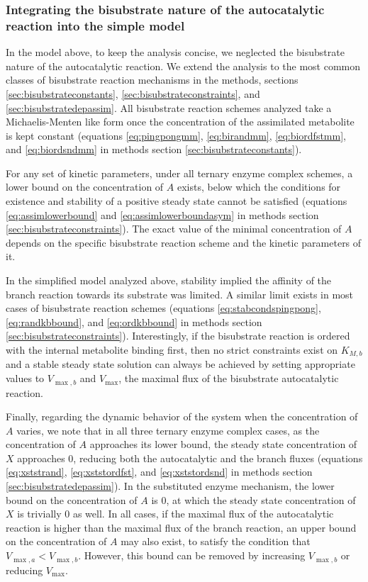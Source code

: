     \subsubsection{Integrating the bisubstrate nature of the autocatalytic reaction into the simple model}
    In the model above, to keep the analysis concise, we neglected the bisubstrate nature of the autocatalytic reaction.
    We extend the analysis to the most common classes of bisubstrate reaction mechanisms in the methods, sections \ref{sec:bisubstrateconstants}, \ref{sec:bisubstrateconstraints}, and \ref{sec:bisubstratedepassim}.
    All bisubstrate reaction schemes analyzed take a Michaelis-Menten like form once the concentration of the assimilated metabolite is kept constant (equations \ref{eq:pingpongmm}, \ref{eq:birandmm}, \ref{eq:biordfstmm}, and \ref{eq:biordsndmm} in methods section \ref{sec:bisubstrateconstants}).

    For any set of kinetic parameters, under all ternary enzyme complex schemes, a lower bound on the concentration of $A$ exists, below which the conditions for existence and stability of a positive steady state cannot be satisfied (equations \ref{eq:assimlowerbound} and \ref{eq:assimlowerboundasym} in methods section \ref{sec:bisubstrateconstraints}).
    The exact value of the minimal concentration of $A$ depends on the specific bisubstrate reaction scheme and the kinetic parameters of it.

    In the simplified model analyzed above, stability implied the affinity of the branch reaction towards its substrate was limited.
    A similar limit exists in most cases of bisubstrate reaction schemes (equations \ref{eq:stabcondspingpong}, \ref{eq:randkbbound}, and \ref{eq:ordkbbound} in methods section \ref{sec:bisubstrateconstraints}).
    Interestingly, if the bisubstrate reaction is ordered with the internal metabolite binding first, then no strict constraints exist on $K_{M,b}$ and a stable steady state solution can always be achieved by setting appropriate values to $V_{\max,b}$ and $V_{\max}$, the maximal flux of the bisubstrate autocatalytic reaction.

    Finally, regarding the dynamic behavior of the system when the concentration of $A$ varies, we note that in all three ternary enzyme complex cases, as the concentration of $A$ approaches its lower bound, the steady state concentration of $X$ approaches $0$, reducing both the autocatalytic and the branch fluxes (equations \ref{eq:xststrand}, \ref{eq:xststordfst}, and \ref{eq:xststordsnd} in methods section \ref{sec:bisubstratedepassim}).
    In the substituted enzyme mechanism, the lower bound on the concentration of $A$ is 0, at which the steady state concentration of $X$ is trivially 0 as well.
    In all cases, if the maximal flux of the autocatalytic reaction is higher than the maximal flux of the branch reaction, an upper bound on the concentration of $A$ may also exist, to satisfy the condition that $V_{\max,a}<V_{\max,b}$.
    However, this bound can be removed by increasing $V_{\max,b}$ or reducing $V_{\max}$.

